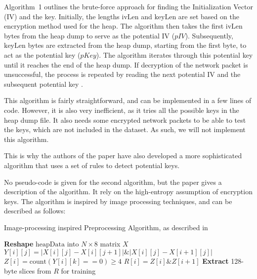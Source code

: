     Algorithm~1 outlines the brute-force approach for finding the Initialization Vector (IV) and the key. Initially, the lengths \(\text{ivLen}\) and \(\text{keyLen}\) are set based on the encryption method used for the heap. The algorithm then takes the first \(\text{ivLen}\) bytes from the heap dump to serve as the potential IV (\(pIV\)). Subsequently, \(\text{keyLen}\) bytes are extracted from the heap dump, starting from the first byte, to act as the potential key (\(pKey\)). The algorithm iterates through this potential key until it reaches the end of the heap dump. If decryption of the network packet is unsuccessful, the process is repeated by reading the next potential IV and the subsequent potential key \cite{SmartKex22}. 

    This algorithm is fairly straightforward, and can be implemented in a few lines of code. However, it is also very inefficient, as it tries all the possible keys in the heap dump file. It also needs some encrypted network packets to be able to test the keys, which are not included in the dataset. As such, we will not implement this algorithm.
    
    This is why the authors of the paper have also developed a more sophisticated algorithm that uses a set of rules to detect potential keys.

    No pseudo-code is given for the second algorithm, but the paper  gives a description of the algorithm. It rely on the high-entropy assumption of encryption keys. The algorithm is inspired by image processing techniques, and can be described as follows:

    \begin{algorithm}
        \caption{Image-processing inspired Preprocessing Algorithm, as described in  \cite{SmartKex22}}
        \begin{algorithmic}[1]
            \State \textbf{Reshape} $\text{heapData}$ into $N \times 8$ matrix $X$
                    \State $Y[i][j] = |X[i][j] - X[i][j+1]| \& |X[i][j] - X[i+1][j]|$
                    \State $Z[i] = \text{count}(Y[i][k] == 0) \geq 4$
                        \State $R[i] = Z[i] \& Z[i+1]$
                    \EndIf
                \EndFor
            \EndFor
            \State \textbf{Extract} 128-byte slices from $R$ for training
        \EndProcedure
        \end{algorithmic}
    \end{algorithm}
    

